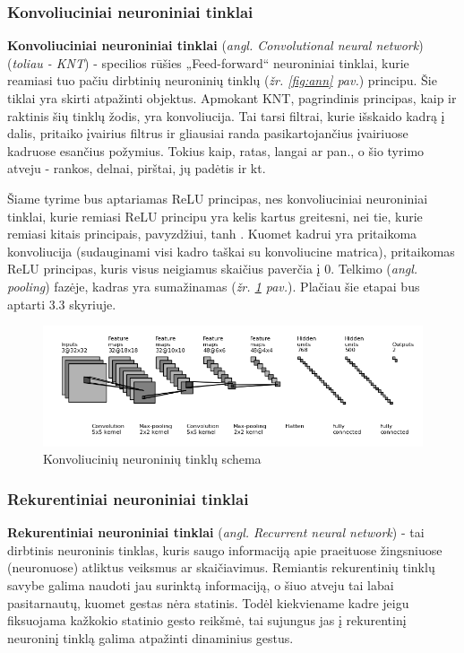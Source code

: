 \documentclass{VUMIFInfKursinis}
\begin{document}
\subsubsection{Konvoliuciniai neuroniniai tinklai}
\textbf{Konvoliuciniai neuroniniai tinklai} (\textit{angl. Convolutional neural network}) (\textit{toliau - KNT}) - specilios rūšies „Feed-forward“ neuroniniai tinklai, kurie reamiasi tuo pačiu dirbtinių neuroninių tinklų (\textit{žr. \ref{fig:ann} pav.}) principu. Šie tiklai yra skirti atpažinti objektus. Apmokant KNT, pagrindinis principas, kaip ir raktinis šių tinklų žodis, yra konvoliucija. Tai tarsi filtrai, kurie išskaido kadrą į dalis, pritaiko įvairius filtrus ir gliausiai randa pasikartojančius įvairiuose kadruose esančius požymius. Tokius kaip, ratas, langai ar pan., o šio tyrimo atveju - rankos, delnai, pirštai, jų padėtis ir kt.

Šiame tyrime bus aptariamas ReLU principas, nes konvoliuciniai neuroniniai tinklai, kurie remiasi ReLU principu yra kelis kartus greitesni, nei tie, kurie remiasi kitais principais, pavyzdžiui, tanh \cite{NIPS2012_4824}. Kuomet kadrui yra pritaikoma konvoliucija (sudauginami visi kadro taškai su konvoliucine matrica), pritaikomas ReLU principas, kuris visus neigiamus skaičius paverčia į 0. Telkimo (\textit{angl. pooling}) fazėje, kadras yra sumažinamas (\textit{žr. \ref{img:cnn} pav.}). Plačiau šie etapai bus aptarti 3.3 skyriuje.

\begin{figure}[H]
	\centering
	\includegraphics[width=.8\linewidth]{img/cnn}
	\caption[]{Konvoliucinių neuroninių tinklų schema\footnotemark}
	\label{img:cnn}
\end{figure}


\subsubsection{Rekurentiniai neuroniniai tinklai}
\textbf{Rekurentiniai neuroniniai tinklai} (\textit{angl. Recurrent neural network}) - tai dirbtinis neuroninis tinklas, kuris saugo informaciją apie praeituose žingsniuose (neuronuose) atliktus veiksmus ar skaičiavimus. Remiantis rekurentinių tinklų savybe galima naudoti jau surinktą informaciją, o šiuo atveju tai labai pasitarnautų, kuomet gestas nėra statinis. Todėl kiekviename kadre jeigu fiksuojama kažkokio statinio gesto reikšmė, tai sujungus jas į rekurentinį neuroninį tinklą galima atpažinti dinaminius gestus.
\end{document}
